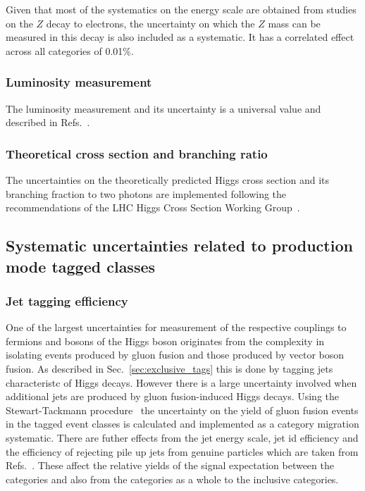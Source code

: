 Given that most of the systematics on the energy scale are obtained from studies on the $Z$ decay to electrons, the uncertainty on which the $Z$ mass can be measured in this decay is also included as a systematic. It has a correlated effect across all categories of 0.01\%.

\subsubsection{Luminosity measurement}

The luminosity measurement and its uncertainty is a \CMS universal value and described in Refs.~\cite{lumi1,lumi2}.

\subsubsection{Theoretical cross section and branching ratio}

The uncertainties on the theoretically predicted \SM Higgs cross section and its branching fraction to two photons are implemented following the recommendations of the LHC Higgs Cross Section Working Group~\cite{LHCHiggsCrossSectionWorkingGroup3}. 

\subsection{Systematic uncertainties related to production mode tagged classes}

\subsubsection{Jet tagging efficiency}

One of the largest uncertainties for measurement of the respective couplings to fermions and bosons of the Higgs boson originates from the complexity in isolating events produced by gluon fusion and those produced by vector boson fusion. As described in Sec.~\ref{sec:exclusive_tags} this is done by tagging jets characteristc of \VBF Higgs decays. However there is a large uncertainty involved when additional jets are produced by gluon fusion-induced Higgs decays. Using the Stewart-Tackmann procedure~\cite{vbf_syst} the uncertainty on the yield of gluon fusion events in the \VBF tagged event classes is calculated and implemented as a category migration systematic. There are futher effects from the jet energy scale, jet id efficiency and the efficiency of rejecting pile up jets from genuine particles which are taken from Refs.~\cite{jet_energy_corrections,jet_energy_corrs2}. These affect the relative yields of the signal expectation between the \VBF categories and also from the \VBF categories as a whole to the inclusive categories.  

